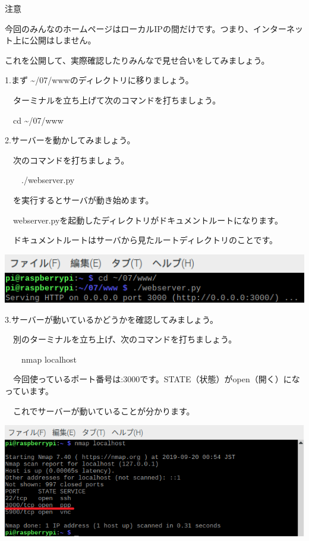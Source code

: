 \documentclass[a4paper,12pt,dvipdfmx]{jarticle}
\begin{document}
注意

今回のみんなのホームページはローカルIPの間だけです。つまり、インターネット上に公開はしません。

これを公開して、実際確認したりみんなで見せ合いをしてみましょう。


\bigskip

1.まず
{\textasciitilde}/07/wwwのディレクトリに移りましょう。

\ \ ターミナルを立ち上げて次のコマンドを打ちましょう。

\ \ cd {\textasciitilde}/07/www


\bigskip

2.サーバーを動かしてみましょう。

\ \ 次のコマンドを打ちましょう。

\ \ 　./webserver.py

\ \ を実行するとサーバが動き始めます。

\ \ webserver.pyを起動したディレクトリがドキュメントルートになります。

\ \ ドキュメントルートはサーバから見たルートディレクトリのことです。



\centering
\includegraphics[width=14.986cm]{ome7-img038.png}
\flushleft


\bigskip


\bigskip

3.サーバーが動いているかどうかを確認してみましょう。

\ \ 別のターミナルを立ち上げ、次のコマンドを打ちましょう。

\ \ 　nmap localhost

\ \ 今回使っているポート番号は:3000です。STATE（状態）がopen（開く）になっています。

\ \ これでサーバーが動いていることが分かります。



\centering
\includegraphics[width=16.124cm]{ome7-img039.png}
\flushleft
\end{document}
